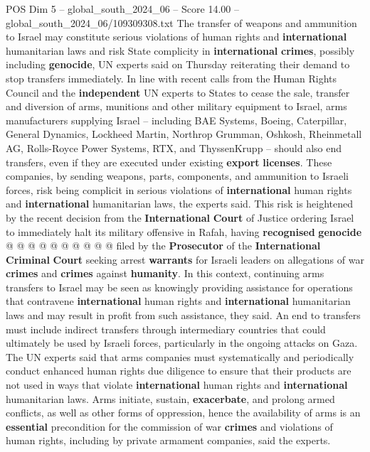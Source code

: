 \begin{textsample}{POS Dim 5 – global\_south\_2024\_06 – Score 14.00 – global\_south\_2024\_06/109309308.txt}  \label{ex:f5_pos_227}
The transfer of weapons and ammunition to Israel may constitute serious violations of human rights and \textbf{international} humanitarian laws and risk State complicity in \textbf{international} \textbf{crimes}, possibly including \textbf{genocide}, UN experts said on Thursday reiterating their demand to stop transfers immediately.
In line with recent calls from the Human Rights Council and the \textbf{independent} UN experts to States to cease the sale, transfer and diversion of arms, munitions and other military equipment to Israel, arms manufacturers supplying Israel -- including BAE Systems, Boeing, Caterpillar, General Dynamics, Lockheed Martin, Northrop Grumman, Oshkosh, Rheinmetall AG, Rolls-Royce Power Systems, RTX, and ThyssenKrupp -- should also end transfers, even if they are executed under existing \textbf{export} \textbf{licenses}.
These companies, by sending weapons, parts, components, and ammunition to Israeli forces, risk being complicit in serious violations of \textbf{international} human rights and \textbf{international} humanitarian laws, the experts said.
This risk is heightened by the recent decision from the \textbf{International} \textbf{Court} of Justice ordering Israel to immediately halt its military offensive in Rafah, having \textbf{recognised} \textbf{genocide} @ @ @ @ @ @ @ @ @ @ filed by the \textbf{Prosecutor} of the \textbf{International} \textbf{Criminal} \textbf{Court} seeking arrest \textbf{warrants} for Israeli leaders on allegations of war \textbf{crimes} and \textbf{crimes} against \textbf{humanity}.
In this context, continuing arms transfers to Israel may be seen as knowingly providing assistance for operations that contravene \textbf{international} human rights and \textbf{international} humanitarian laws and may result in profit from such assistance, they said.
An end to transfers must include indirect transfers through intermediary countries that could ultimately be used by Israeli forces, particularly in the ongoing attacks on Gaza.
The UN experts said that arms companies must systematically and periodically conduct enhanced human rights due diligence to ensure that their products are not used in ways that violate \textbf{international} human rights and \textbf{international} humanitarian laws.
Arms initiate, sustain, \textbf{exacerbate}, and prolong armed conflicts, as well as other forms of oppression, hence the availability of arms is an \textbf{essential} precondition for the commission of war \textbf{crimes} and violations of human rights, including by private armament companies, said the experts.

\end{textsample}
